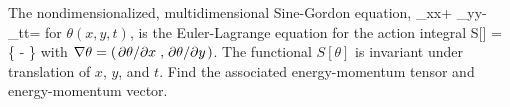 \newcommand{\tht}{\theta}
\newcommand{\thtxx}{\tht_{xx}}
\newcommand{\thtyy}{\tht_{yy}}
\newcommand{\thttt}{\tht_{tt}}
\newcommand{\thtt}{\tht_t}
\newcommand{\thtx}{\tht_x}
\newcommand{\thty}{\tht_y}
\newcommand{\sint}{\sin{\tht}}
\newcommand{\dxdydt}{\dxdy \dd{t}}

\begin{statement}{}
	The nondimensionalized, multidimensional Sine-Gordon equation,
	\beq
		\thtxx + \thtyy - \thttt = \sint
	\eeq
	for $\tht(x, y, t)$, is the Euler-Lagrange equation for the action integral
	\beq
		S[\tht] = \intR \left\{  \left[ \thtt^2 - (\nabla\tht)^2 \right] - \sint \right\} \dxdydt
	\eeq
	with $\nabla\tht = (\pdv*{\tht}{x}, \pdv*{\tht}{y})$.  The functional $S[\tht]$ is invariant under translation of $x$, $y$, and $t$.  Find the associated energy-momentum tensor and energy-momentum vector.
\end{statement}

